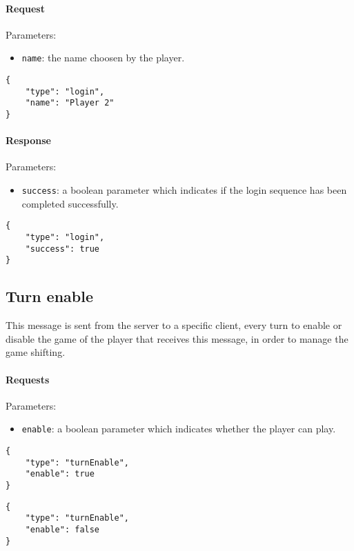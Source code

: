 \documentclass[a4paper]{article}
\begin{document}
	\paragraph{Request} Parameters:

	\begin{itemize}
		\item \verb|name|: the name choosen by the player.
	\end{itemize}

	\begin{verbatim}
{
	"type": "login",
	"name": "Player 2"
}
	\end{verbatim}

	\paragraph{Response} Parameters:

	\begin{itemize}
		\item \verb|success|: a boolean parameter which indicates if the login sequence has been completed successfully.
	\end{itemize}

	\begin{verbatim}
{
	"type": "login",
	"success": true
}
	\end{verbatim}

	\subsection{Turn enable}

	This message is sent from the server to a specific client, every turn to enable or disable the game of the player that receives this message, in order to manage the game shifting.

	\paragraph{Requests} Parameters:

	\begin{itemize}
		\item \verb|enable|: a boolean parameter which indicates whether the player can play.
	\end{itemize}

	\begin{multicols}{2}
		\begin{verbatim}
{
	"type": "turnEnable",
	"enable": true
}
		\end{verbatim}
		\begin{verbatim}
{
	"type": "turnEnable",
	"enable": false
}
		\end{verbatim}
	\end{multicols}
\end{document}
